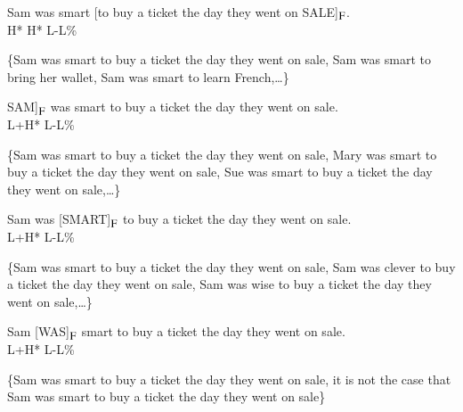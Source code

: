 \documentclass[11pt,fleqn]{article}
\newcommand{\foc}{$_{\mbox{\small F}}$}
\newcommand{\6}{\mbox{$[\hspace*{-.6mm}[$}}
\newcommand{\9}{\mbox{$]\hspace*{-.6mm}]$}}
\begin{document}
\begin{exe}

\ex\label{vp}

\begin{xlist}

\ex Sam was smart [to buy a ticket the day they went on SALE]\foc.
\\
\hspace*{1.8cm} H* \hspace*{5.8cm} H* \hspace*{.4cm} L-L\%

\ex \{Sam was smart to buy a ticket the day they went on sale, Sam was smart to bring her wallet, Sam was smart to learn French,\ldots\}


\end{xlist}

\ex\label{np} 
\begin{xlist}

\ex {[}SAM]\foc{} was smart to buy a ticket the day they went on sale.  \\
L+H* \hspace*{3.5cm} L-L\%

\ex \{Sam was smart to buy a ticket the day they went on sale, Mary was smart to buy a ticket the day they went on sale, Sue was smart to buy a ticket the day they went on sale,\ldots\}

\end{xlist}


\ex\label{adj}

\begin{xlist}

\ex Sam was [SMART]\foc{} to buy a ticket the day they went on sale.
\\
\hspace*{1.2cm} L+H* \hspace*{2.4cm} L-L\%

\ex \{Sam was smart to buy a ticket the day they went on sale, Sam was clever to buy a ticket the day they went on sale, Sam was wise to buy a ticket the day they went on sale,\ldots\}


\end{xlist}

\ex\label{aux} 

\begin{xlist}

\ex Sam [WAS]\foc{} smart to buy a ticket the day they went on sale.
\\
\hspace*{.8cm} L+H* \hspace*{3cm} L-L\%

\ex \{Sam was smart to buy a ticket the day they went on sale, it is not the case that Sam was smart to buy a ticket the day they went on sale\}
 
\end{xlist}


\end{exe}
\end{document}
